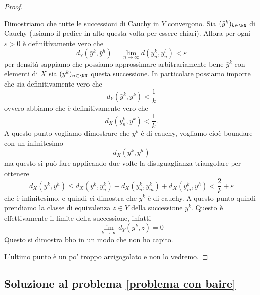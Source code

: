 \documentclass[11pt]{scrartcl}
\begin{document}
\begin{proof}
\begin{subproof}[Passo 5]
  			Dimostriamo che tutte le successioni di Cauchy in $Y$ convergono. Sia $(\bar{y}^k)_{k\in\NN}$ di Cauchy (usiamo il pedice in alto questa volta per essere chiari). Allora per ogni $\varepsilon>0$ è definitivamente vero che
  			$$d_Y(\bar{y}^k,\bar{y}^h)=\lim_{n\to\infty}d(y_n^k,y_n^l)<\varepsilon$$
  			per densità sappiamo che possiamo approssimare arbitrariamente bene $\bar{y}^k$ con elementi di $X$ sia $(y^k)_{n\in\NN}$ questa successione. In particolare possiamo imporre che sia definitivamente vero che 
  			$$d_Y(\bar{y}^k,y^k)<\frac{1}{k}$$
  			ovvero abbiamo che è definitivamente vero che
  			$$d_X(y^k_n,y^k)<\frac{1}{k}.$$
  			A questo punto vogliamo dimostrare che $y^k$ è di cauchy, vogliamo cioè boundare con un infinitesimo
  			$$d_X(y^k,y^h)$$
  			ma questo si può fare applicando due volte la disuguaglianza triangolare per ottenere
  			$$d_X(y^k,y^h)\le d_X(y^k,y^k_n)+d_X(y^k_n,y^k_m)+d_X(y^k_m,y^h)<\frac{2}{k}+\varepsilon$$
  			che è infinitesimo, e quindi ci dimostra che $y^k$ è di cauchy. A questo punto quindi prendiamo la classe di equivalenza $z\in Y$ della successione $y^k$. Questo è effettivamente il limite della successione, infatti 
  			$$\lim_{k\to \infty}d_Y(\bar{y}^k,z)=0$$
  			Questo si dimostra bho in un modo che non ho capito.
  		\end{subproof}
  		L'ultimo punto è un po' troppo arzigogolato e non lo vedremo.
  	\end{proof}
  	\subsection{Soluzione al problema \ref{problema con baire}}
  	
\end{document}
